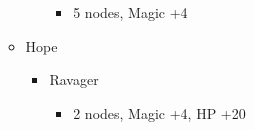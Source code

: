\begin{paracol}{2}
\begin{menu}
\begin{itemize}
\begin{itemize}
\begin{itemize}
					            \begin{itemize}
						            \item 5 nodes, Magic +4
					            \end{itemize}
				      \end{itemize}
				\item Hope
				      \begin{itemize}
					      \item Ravager
					            \begin{itemize}
						            \item 2 nodes, Magic +4, HP +20
					            \end{itemize}
				      \end{itemize}
			\end{itemize}
		\end{itemize}
	\end{menu}


\end{paracol}
